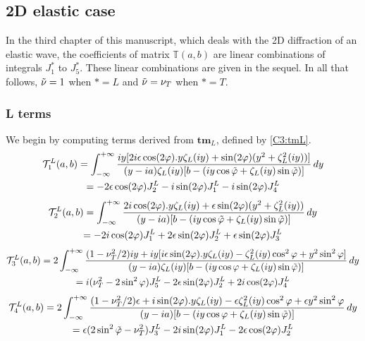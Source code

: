 \subsection{2D elastic case}
\label{finalT2D}
In the third chapter of this manuscript, which deals with the 2D diffraction of an elastic wave, the coefficients of matrix $\mathbb{T}(a,b)$ are linear combinations of integrals $J_1^*$ to $J_5^*$. These linear combinations are given in the sequel. In all that follows, $\tilde{\nu}=1$ when $*=L$ and $\tilde{\nu}=\nu_T$ when $*=T$.
\subsubsection{L terms}
We begin by computing terms derived from $\mathbf{tm}_L$, defined by \eqref{C3:tmL}.
\begin{multline}
\hfill\mathcal{T}_1^L(a,b)=\int_{-\infty}^{+\infty} \frac{iy\lbrack 2i\epsilon \cos(2\varphi).y\zeta_L(iy)+\sin (2\varphi)(y^2+\zeta_L^2(iy))\rbrack}{(y-ia)\zeta_L(iy)\lbrack b-(iy\cos \phiti+  \zeta_L(iy) \sin \phiti) \rbrack} \, dy \hfill\\
\hfill=-2\epsilon\cos(2\varphi)J_2^L-i\sin(2\varphi)J_1^L-i\sin(2\varphi)J_4^L\hfill
\end{multline}
\begin{multline}
\hfill\mathcal{T}_2^L(a,b)=\int_{-\infty}^{+\infty} \frac{2i\cos(2\varphi).y\zeta_L(iy)+\epsilon \sin (2\varphi)(y^2+\zeta_L^2(iy))}{(y-ia)\lbrack b-(iy\cos\phiti+ \zeta_L(iy) \sin \phiti) \rbrack} \, dy \hfill\\
\hfill=-2i\cos(2\varphi)J_1^L+2\epsilon\sin(2\varphi)J_2^L+\epsilon\sin(2\varphi)J_3^L\hfill
\end{multline}
\begin{multline}
\hfill\mathcal{T}_3^L(a,b)= 2 \int_{-\infty}^{+\infty} \frac{(1-\nu_T^2/2)iy+iy\lbrack i\epsilon\sin(2\varphi).y\zeta_L(iy)-\zeta_L^2(iy)\cos^2\varphi+y^2\sin^2\varphi  \rbrack}{(y-ia)\zeta_L(iy)\lbrack b- (iy\cos \varphi+\zeta_L(iy)\sin\phiti) \rbrack} \, dy \hfill \\
\hfill=i(\nu_T^2-2\sin^2\varphi) J_5^L-2\epsilon\sin(2\varphi)J_2^L+2i\cos(2\varphi)J_4^L\hfill
\end{multline}
\begin{multline}
\hfill \mathcal{T}_4^L(a,b)=  2 \int_{-\infty}^{+\infty} \frac{ (1-\nu_T^2/2)\epsilon + i\sin(2\varphi).y\zeta_L(iy)-\epsilon \zeta_L^2(iy)\cos^2\varphi+\epsilon y^2\sin^2\varphi }{(y-ia)\lbrack b- (iy\cos \varphi+\zeta_L(iy)\sin \phiti) \rbrack} \, dy \hfill \\
\hfill =\epsilon(2\sin^2\phiti-\nu_T^2) J_3^L-2i\sin(2\varphi)J_1^L-2\epsilon\cos(2\varphi)J_2^L \hfill
\end{multline}
